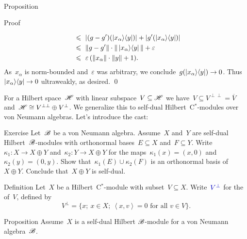 \documentclass[b]{subfiles}
\begin{document}
\begin{parsec}
\begin{point}{Proposition}
\begin{point}{Proof}
\begin{point}
\begin{align*}
            &\ \leqslant\  | (g-g')(\left|x_\alpha\right>\!\left<y\right|)|  +
                    | g'(\left|x_\alpha\right>\!\left<y\right|) | \\
            &\ \leqslant\  \|g - g'\| \cdot \| \left|x_\alpha\right>\!\left<y\right| \|  + \varepsilon\\
            &\ \leqslant\  \varepsilon \,(\| x_\alpha\| \cdot \|y\| + 1).
\end{align*}
As~$x_\alpha$ is norm-bounded
    and~$\varepsilon$ was arbitrary,
        we conclude~$g(\left|x_\alpha\right>\!\left<y\right|) \to 0$.
    Thus~$\left|x_\alpha\right>\!\left<y\right| \to 0$ ultraweakly, as desired.
    \qed
\end{point}
\end{point}
\end{point}
\end{parsec}

\begin{parsec}%
\begin{point}%
For a Hilbert space~$\mathscr{H}$
    with linear subspace~$V \subseteq \mathscr{H}$
    we have~$V \subseteq V^{\perp\perp} = \overline{V}$
    and~$\mathscr{H} \cong V^{\perp\perp} \oplus  V^\perp$.
We generalize this to self-dual Hilbert~C$^*$-modules
    over von Neumann algebras.
Let's introduce the cast:
\end{point}
\begin{point}{Exercise}%
Let~$\mathscr{B}$ be a von Neumann algebra.
Assume~$X$ and~$Y$ are self-dual Hilbert~$\mathscr{B}$-modules
    with orthonormal bases~$E \subseteq X$ and~$F \subseteq Y$.
Write~$\kappa_1\colon X \to X \oplus Y$
    and~$\kappa_2 \colon Y \to X \oplus Y$
    for the maps~$\kappa_1(x) = (x,0)$ and~$\kappa_2(y) = (0, y)$.
Show that~$\kappa_1(E) \cup \kappa_2(F)$
    is an orthonormal basis of~$X \oplus Y$.
    Conclude that~$X \oplus Y$ is self-dual.
\end{point}
\begin{point}{Definition}%
Let~$X$ be a Hilbert~C$^*$-module
    with subset~$V \subseteq X$.
    Write~$\Define{V^\perp}$ for the 
    of~$V$, defined by
\begin{equation*}
    V^\perp = \{ x; \ x \in X;\ \left<x,v\right>=0\text{ for all }v\in V\}.
\end{equation*}
\end{point}
\begin{point}{Proposition}%
Assume~$X$ is a self-dual Hilbert $\mathscr{B}$-module
    for a von Neumann algebra~$\mathscr{B}$.

\end{point}
\end{parsec}
\end{document}
